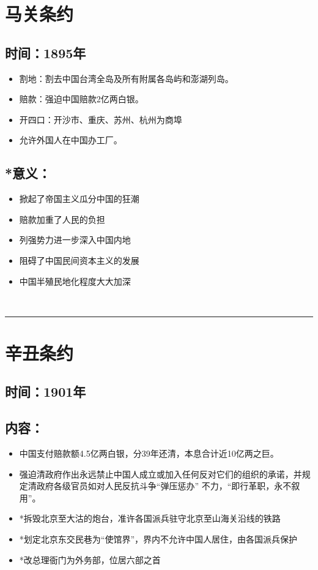 \documentclass{article}
\begin{document}
\section*{马关条约}
\subsection*{时间：1895年}
\begin{itemize}
    \item 割地：割去中国台湾全岛及所有附属各岛屿和澎湖列岛。
    \item 赔款：强迫中国赔款2亿两白银。
    \item 开四口：开沙市、重庆、苏州、杭州为商埠
    \item 允许外国人在中国办工厂。
\end{itemize}
\subsection*{*意义：}
\begin{itemize}
\item 掀起了帝国主义瓜分中国的狂潮
\item 赔款加重了人民的负担
\item 列强势力进一步深入中国内地
\item 阻碍了中国民间资本主义的发展
\item 中国半殖民地化程度大大加深
\end{itemize}
\ \hrule

\section*{辛丑条约}
\subsection*{时间：1901年}
\subsection*{内容：}
\begin{itemize}
    \item 中国支付赔款额4.5亿两白银，分39年还清，本息合计近10亿两之巨。
    \item 强迫清政府作出永远禁止中国人成立或加入任何反对它们的组织的承诺，并规定清政府各级官员如对人民反抗斗争“弹压惩办” 不力，“即行革职，永不叙用”。
    \item *拆毁北京至大沽的炮台，准许各国派兵驻守北京至山海关沿线的铁路
    \item *划定北京东交民巷为“使馆界”，界内不允许中国人居住，由各国派兵保护
    \item *改总理衙门为外务部，位居六部之首
\end{itemize}
\end{document}
